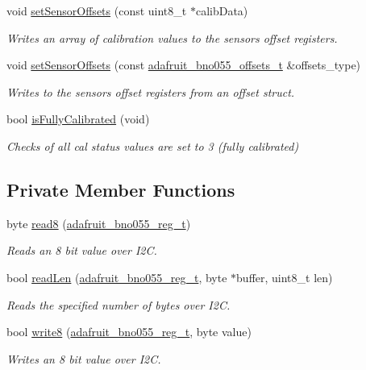 \begin{DoxyCompactItemize}
void \hyperlink{classAdafruit__BNO055_a0061212193d496480ea03f2bf65c146b}{set\+Sensor\+Offsets} (const uint8\+\_\+t $\ast$calib\+Data)
\begin{DoxyCompactList}\small\item\em Writes an array of calibration values to the sensor\textquotesingle{}s offset registers. \end{DoxyCompactList}\item 
void \hyperlink{classAdafruit__BNO055_a5bf6f9bf48b4dc750e0d33a7d71127c6}{set\+Sensor\+Offsets} (const \hyperlink{structadafruit__bno055__offsets__t}{adafruit\+\_\+bno055\+\_\+offsets\+\_\+t} \&offsets\+\_\+type)
\begin{DoxyCompactList}\small\item\em Writes to the sensor\textquotesingle{}s offset registers from an offset struct. \end{DoxyCompactList}\item 
bool \hyperlink{classAdafruit__BNO055_a52ca278d8a1a45f383de07ea0669f9b9}{is\+Fully\+Calibrated} (void)
\begin{DoxyCompactList}\small\item\em Checks of all cal status values are set to 3 (fully calibrated) \end{DoxyCompactList}\end{DoxyCompactItemize}
\subsection*{Private Member Functions}
\begin{DoxyCompactItemize}
\item 
byte \hyperlink{classAdafruit__BNO055_a6247e63696145d19a0a5c53dcfd5fa0c}{read8} (\hyperlink{classAdafruit__BNO055_a37bdd791ec4916fb29933a5b78be0485}{adafruit\+\_\+bno055\+\_\+reg\+\_\+t})
\begin{DoxyCompactList}\small\item\em Reads an 8 bit value over I2C. \end{DoxyCompactList}\item 
bool \hyperlink{classAdafruit__BNO055_a334c0a59391abc93b4eeeb7a7b1d2b7f}{read\+Len} (\hyperlink{classAdafruit__BNO055_a37bdd791ec4916fb29933a5b78be0485}{adafruit\+\_\+bno055\+\_\+reg\+\_\+t}, byte $\ast$buffer, uint8\+\_\+t len)
\begin{DoxyCompactList}\small\item\em Reads the specified number of bytes over I2C. \end{DoxyCompactList}\item 
bool \hyperlink{classAdafruit__BNO055_a593f880b8b7c088a8c2829adb8d53fc2}{write8} (\hyperlink{classAdafruit__BNO055_a37bdd791ec4916fb29933a5b78be0485}{adafruit\+\_\+bno055\+\_\+reg\+\_\+t}, byte value)
\begin{DoxyCompactList}\small\item\em Writes an 8 bit value over I2C. \end{DoxyCompactList}\end{DoxyCompactItemize}
